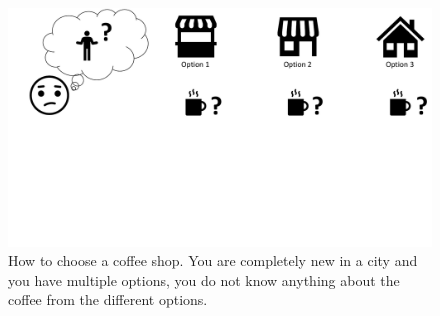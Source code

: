 \begin{figure}
    \centering
    \includegraphics[width=1\textwidth]{Plots/CoffeExample.pdf}
    \vspace{-4cm}
    \caption[Coffee Shop Example]{How to choose a coffee shop. You are completely new in a city and you have multiple options, you do not know anything about the coffee from the different options.}
    \label{fig:Coffe_Example}
\end{figure}


